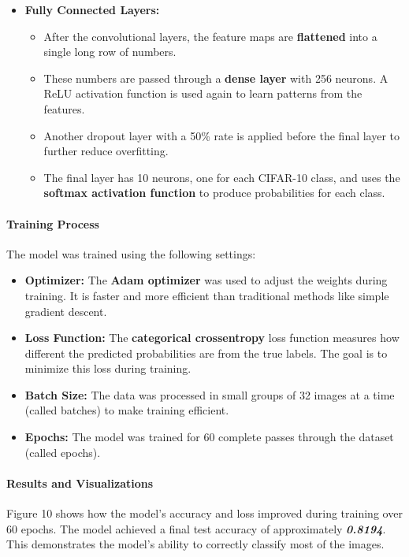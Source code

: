\documentclass[lettersize,journal]{IEEEtran}
\begin{document}
\begin{itemize}
    \item \textbf{Fully Connected Layers:}
    \begin{itemize}
        \item After the convolutional layers, the feature maps are \textbf{flattened} into a single long row of numbers.
        \item These numbers are passed through a \textbf{dense layer} with 256 neurons. A ReLU activation function is used again to learn patterns from the features.
        \item Another dropout layer with a 50\% rate is applied before the final layer to further reduce overfitting.
        \item The final layer has 10 neurons, one for each CIFAR-10 class, and uses the \textbf{softmax activation function} to produce probabilities for each class.
    \end{itemize}
\end{itemize}

\paragraph{\textbf{Training Process}}

The model was trained using the following settings:
\begin{itemize}
    \item \textbf{Optimizer:} The \textbf{Adam optimizer} was used to adjust the weights during training. It is faster and more efficient than traditional methods like simple gradient descent.
    \item \textbf{Loss Function:} The \textbf{categorical crossentropy} loss function measures how different the predicted probabilities are from the true labels. The goal is to minimize this loss during training.
    \item \textbf{Batch Size:} The data was processed in small groups of 32 images at a time (called batches) to make training efficient.
    \item \textbf{Epochs:} The model was trained for 60 complete passes through the dataset (called epochs).
\end{itemize}

\paragraph{\textbf{Results and Visualizations}}

Figure 10 shows how the model's accuracy and loss improved during training over 60 epochs. The model achieved a final test accuracy of approximately \textbf{\textit{0.8194}}. This demonstrates the model's ability to correctly classify most of the images.
\end{document}
